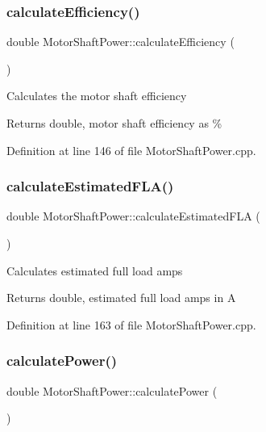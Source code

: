 \subsubsection{\texorpdfstring{calculate\+Efficiency()}{calculateEfficiency()}}
{\footnotesize\ttfamily double Motor\+Shaft\+Power\+::calculate\+Efficiency (\begin{DoxyParamCaption}{ }\end{DoxyParamCaption})}

Calculates the motor shaft efficiency

\begin{DoxyReturn}{Returns}
double, motor shaft efficiency as \% 
\end{DoxyReturn}


Definition at line 146 of file Motor\+Shaft\+Power.\+cpp.

\mbox{\label{class_motor_shaft_power_a120b76be1b3b9fc3d67e37ecee0eb767}} 
\subsubsection{\texorpdfstring{calculate\+Estimated\+F\+L\+A()}{calculateEstimatedFLA()}}
{\footnotesize\ttfamily double Motor\+Shaft\+Power\+::calculate\+Estimated\+F\+LA (\begin{DoxyParamCaption}{ }\end{DoxyParamCaption})}

Calculates estimated full load amps

\begin{DoxyReturn}{Returns}
double, estimated full load amps in A 
\end{DoxyReturn}


Definition at line 163 of file Motor\+Shaft\+Power.\+cpp.

\mbox{\label{class_motor_shaft_power_a4a2756922b290bec13550110aac25b8c}} 
\subsubsection{\texorpdfstring{calculate\+Power()}{calculatePower()}}
{\footnotesize\ttfamily double Motor\+Shaft\+Power\+::calculate\+Power (\begin{DoxyParamCaption}{ }\end{DoxyParamCaption})}

